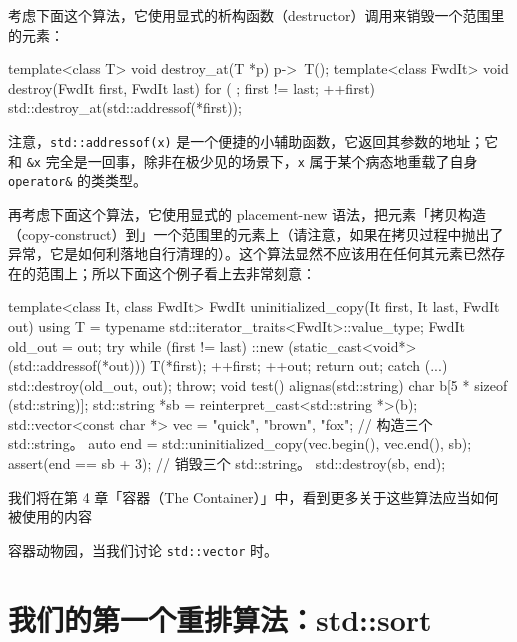 考虑下面这个算法，它使用显式的析构函数（destructor）调用来销毁一个范围里的元素：

\begin{codebox}[cpp]
    template<class T>
    void destroy_at(T *p)
    {
      p->~T();
    }
    template<class FwdIt>
    void destroy(FwdIt first, FwdIt last)
    {
      for ( ; first != last; ++first) {
        std::destroy_at(std::addressof(*first));
      }
    }
\end{codebox}

注意，\texttt{std::\allowbreak{}addressof(\allowbreak{}x)\allowbreak{}} 是一个便捷的小辅助函数，它返回其参数的地址；它和 \texttt{\&x} 完全是一回事，除非在极少见的场景下，\texttt{x} 属于某个病态地重载了自身 \texttt{operator\&} 的类类型。

再考虑下面这个算法，它使用显式的 placement-new 语法，把元素「拷贝构造（copy-construct）到」一个范围里的元素上（请注意，如果在拷贝过程中抛出了异常，它是如何利落地自行清理的）。这个算法显然不应该用在任何其元素已然存在的范围上；所以下面这个例子看上去非常刻意：

\begin{codebox}[cpp]
    template<class It, class FwdIt>
    FwdIt uninitialized_copy(It first, It last, FwdIt out)
    {
      using T = typename std::iterator_traits<FwdIt>::value_type;
      FwdIt old_out = out;
      try {
        while (first != last) {
          ::new (static_cast<void*>(std::addressof(*out))) T(*first);
          ++first;
          ++out;
        }
        return out;
      } catch (...) {
        std::destroy(old_out, out);
        throw;
      }
    }
    void test()
    {
      alignas(std::string) char b[5 * sizeof (std::string)];
      std::string *sb = reinterpret_cast<std::string *>(b);
      std::vector<const char *> vec = {"quick", "brown", "fox"};
      // 构造三个 std::string。
      auto end = std::uninitialized_copy(vec.begin(), vec.end(), sb);
      assert(end == sb + 3);
      // 销毁三个 std::string。
      std::destroy(sb, end);
    }
\end{codebox}

我们将在第 4 章「容器（The Container）」中，看到更多关于这些算法应当如何被使用的内容

容器动物园，当我们讨论 \texttt{std::\allowbreak{}vector} 时。

\section{我们的第一个重排算法：std::sort}

